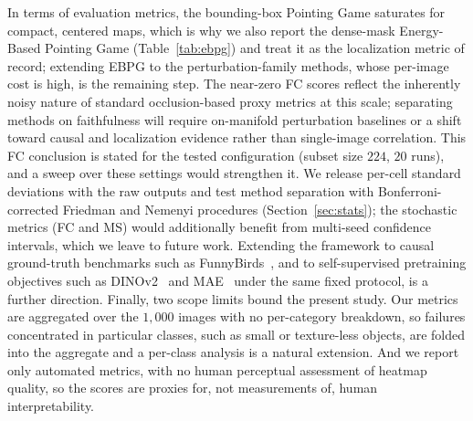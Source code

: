 \documentclass[final,5p,times,twocolumn]{elsarticle}
\begin{document}
In terms of evaluation metrics, the bounding-box Pointing Game saturates for compact, centered maps, which is why we also report the dense-mask Energy-Based Pointing Game (Table~\ref{tab:ebpg}) and treat it as the localization metric of record; extending EBPG to the perturbation-family methods, whose per-image cost is high, is the remaining step. The near-zero FC scores reflect the inherently noisy nature of standard occlusion-based proxy metrics at this scale; separating methods on faithfulness will require on-manifold perturbation baselines or a shift toward causal and localization evidence rather than single-image correlation. This FC conclusion is stated for the tested configuration (subset size $224$, $20$ runs), and a sweep over these settings would strengthen it. We release per-cell standard deviations with the raw outputs and test method separation with Bonferroni-corrected Friedman and Nemenyi procedures (Section~\ref{sec:stats}); the stochastic metrics (FC and MS) would additionally benefit from multi-seed confidence intervals, which we leave to future work. Extending the framework to causal ground-truth benchmarks such as FunnyBirds~\cite{hesse2023funnybirds}, and to self-supervised pretraining objectives such as DINOv2~\cite{oquab2024dinov2} and MAE~\cite{he2022mae} under the same fixed protocol, is a further direction. Finally, two scope limits bound the present study. Our metrics are aggregated over the $1{,}000$ images with no per-category breakdown, so failures concentrated in particular classes, such as small or texture-less objects, are folded into the aggregate and a per-class analysis is a natural extension. And we report only automated metrics, with no human perceptual assessment of heatmap quality, so the scores are proxies for, not measurements of, human interpretability.

\end{document}
